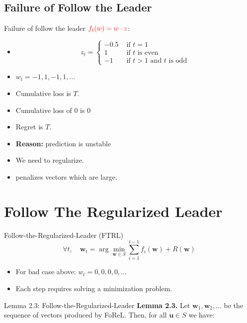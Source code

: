 \documentclass[handout]{beamer}
\begin{document}
\subsection{Failure of Follow the Leader}

\begin{frame}{Failure of follow the leader}
$\textcolor{red}{f_t(w) = w \cdot z}$:
\begin{itemize}
\item
  $$z_t= \begin{cases}
           -0.5 & \text{ if } t=1\\
           1 & \text{ if } t \text{ is even} \\
           -1 & \text{ if } t>1 \mbox{ and } t \text{ is odd}
         \end{cases}
         $$
         \item $w_t=-1,1,-1,1,\ldots$
  \item Cumulative loss is $T$.
  \item Cumulative loss of $0$ is $0$
  \item Regret is $T$.
  \item {\bf Reason:} prediction is unstable
  \item We need to regularize.
    \item {} penalizes vectors which are large.
  \end{itemize}
\end{frame}

\section{Follow The Regularized Leader}
\begin{frame}{Follow-the-Regularized-Leader (FTRL)}
        \begin{equation*}
            \forall t, \quad \mathbf{w}_t = \arg\min_{\mathbf{w} \in S} \sum_{i=1}^{t-1} f_i(\mathbf{w}) + R(\mathbf{w})
        \end{equation*}
\begin{itemize}
  \item For bad case above: $w_t=0,0,0,0,\ldots$
  \item Each step requires solving a minimization problem.
    \end{itemize}
\end{frame}


\begin{frame}{Lemma 2.3: Follow-the-Regularized-Leader}
    \textbf{Lemma 2.3.} Let $\mathbf{w}_1, \mathbf{w}_2, \dots$ be the sequence of vectors produced by FoReL. Then, for all $\mathbf{u} \in S$ we have:
\end{frame}
\end{document}
